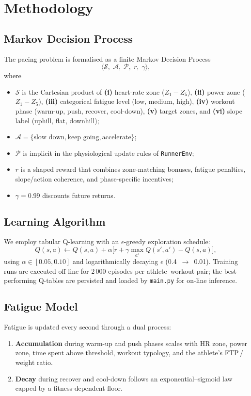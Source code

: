 \documentclass[a4paper,12pt]{article}
\begin{document}
\section{Methodology}
\subsection{Markov Decision Process}
The pacing problem is formalised as a finite Markov Decision Process  
\[
\langle \mathcal{S},\; \mathcal{A},\; \mathcal{P},\; r,\; \gamma \rangle,
\]
where  

\begin{itemize}
  \item $\mathcal{S}$ is the Cartesian product of \textbf{(i)} heart-rate zone ($Z_1\!-\!Z_5$), \textbf{(ii)} power zone ($Z_1\!-\!Z_5$), \textbf{(iii)} categorical fatigue level (low, medium, high), \textbf{(iv)} workout phase (warm-up, push, recover, cool-down), \textbf{(v)} target zones, and \textbf{(vi)} slope label (uphill, flat, downhill);
  \item $\mathcal{A}=\{\text{slow down},\text{keep going},\text{accelerate}\}$;
  \item $\mathcal{P}$ is implicit in the physiological update rules of \texttt{RunnerEnv};
  \item $r$ is a shaped reward that combines zone-matching bonuses, fatigue penalties, slope/action coherence, and phase-specific incentives;
  \item $\gamma=0.99$ discounts future returns.
\end{itemize}

\subsection{Learning Algorithm}
We employ tabular Q-learning with an $\epsilon$-greedy exploration schedule:
\[
Q(s,a)\leftarrow Q(s,a)+\alpha\bigl[r+\gamma\max_{a'}Q(s',a')-Q(s,a)\bigr],
\]
using $\alpha\in[0.05,0.10]$ and logarithmically decaying $\epsilon$ (0.4~$\rightarrow$~0.01).  
Training runs are executed off-line for $2\,000$ episodes per athlete–workout pair; the best performing Q-tables are persisted and loaded by \texttt{main.py} for on-line inference.

\subsection{Fatigue Model}
Fatigue is updated every second through a dual process:

\begin{enumerate}
  \item \textbf{Accumulation} during warm-up and push phases scales with HR zone, power zone, time spent above threshold, workout typology, and the athlete’s FTP\,/\,weight ratio.
  \item \textbf{Decay} during recover and cool-down follows an exponential–sigmoid law capped by a fitness-dependent floor.
\end{enumerate}
\end{document}
